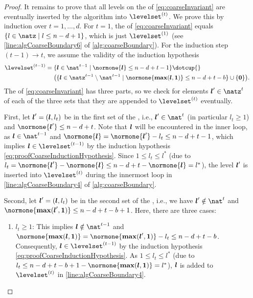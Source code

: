 \begin{proof}
  It remains to prove that all levels on the \rhs of
  \eqref{eq:coarseInvariant}
  are eventually inserted by the algorithm into $\levelset^{(t)}$.
  We prove this by induction over $t = 1, \dotsc, d$.
  For $t = 1$, the \rhs of \eqref{eq:coarseInvariant} equals
  $\{l \in \natz \mid l \le n-d+1\}$, which is just $\levelset^{(1)}$
  (see \cref{line:algCoarseBoundary6} of \cref{alg:coarseBoundary}).
  For the induction step $(t - 1) \to t$, we assume
  the validity of the induction hypothesis
  \begin{equation}
    \label{eq:proofCoarseInductionHypothesis}
    \begin{aligned}
      \levelset^{(t-1)}
      &= \{\*l \in \nat^{t-1} \mid
      \normone{\*l} \le n-d+t-1\} \dotcup {}\\
      &\hphantom{{}={}}
      \paren*{
        \{\*l \in \natz^{t-1} \setminus \nat^{t-1} \mid
        \normone{\vecmax(\*l, \*1)} \le n-d+t-b\} \cup
        \{\vec{0}\}
      }.
    \end{aligned}
  \end{equation}
  The \rhs of \eqref{eq:coarseInvariant} has three parts,
  so we check for elements $\*l' \in \natz^t$
  of each of the three sets that they are appended to $\levelset^{(t)}$
  eventually.
  
  First, let ${\boldsymbol{l}}' = ({\boldsymbol{l}}, l_t)$ be in the first set of the \rhs,
  i.e., $\*l' \in \nat^t$ (in particular $l_t \ge 1$) and
  $\normone{\*l'} \le n - d + t$.
  Note that ${\boldsymbol{l}}$ will be encountered in the inner loop, as
  $\*l \in \nat^{t-1}$ and
  $\normone{\*l} = \normone{\*l'} - l_t \le n - d + t - 1$,
  which implies $\*l \in \levelset^{(t-1)}$ by the induction
  hypothesis \eqref{eq:proofCoarseInductionHypothesis}.
  Since $1 \le l_t \le l^\ast$
  (due to
  $l_t = \normone{\*l'} - \normone{\*l} \le n-d+t - \normone{\*l} = l^\ast$),
  the level ${\boldsymbol{l}}'$ is inserted into $\levelset^{(t)}$ during the innermost loop
  in \cref{line:algCoarseBoundary4} of \cref{alg:coarseBoundary}.
  
  Second, let ${\boldsymbol{l}}' = ({\boldsymbol{l}}, l_t)$
  be in the second set of the \rhs, i.e., we have
  $\*l' \notin \nat^t$ and
  $\normone{\vecmax(\*l', \*1)} \le n-d+t-b+1$.
  Here, there are three cases:
  \begin{enumerate}
    \item
    $l_t \ge 1$:
    This implies $\*l \notin \nat^{t-1}$ and 
    $\normone{\vecmax(\*l, \*1)}
    = \normone{\vecmax(\*l', \*1)} - l_t
    \le n-d+t-b$.
    Consequently, $\*l \in \levelset^{(t-1)}$ by the induction hypothesis
    \eqref{eq:proofCoarseInductionHypothesis}.
    As $1 \le l_t \le l^\ast$
    (due to $l_t \le n-d+t-b+1 -
    \normone{\vecmax(\*l, \*1)} = l^\ast$),
    ${\boldsymbol{l}}$ is added to $\levelset^{(t)}$ in \cref{line:algCoarseBoundary4}.
    

\end{enumerate}
\end{proof}
